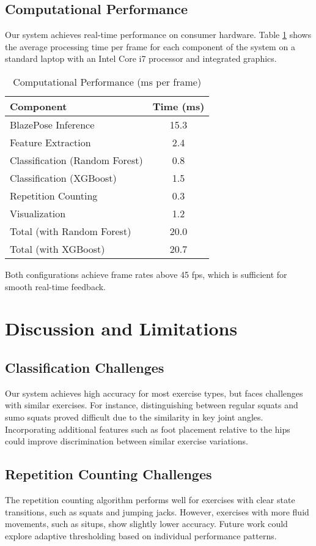 \documentclass[conference]{IEEEtran}
\begin{document}
\subsection{Computational Performance}
Our system achieves real-time performance on consumer hardware. Table \ref{tab:computation} shows the average processing time per frame for each component of the system on a standard laptop with an Intel Core i7 processor and integrated graphics.

\begin{table}[htbp]
\centering
\caption{Computational Performance (ms per frame)}
\label{tab:computation}
\begin{tabular}{@{}lc@{}}
\toprule
\textbf{Component} & \textbf{Time (ms)} \\
\midrule
BlazePose Inference & 15.3 \\
Feature Extraction & 2.4 \\
Classification (Random Forest) & 0.8 \\
Classification (XGBoost) & 1.5 \\
Repetition Counting & 0.3 \\
Visualization & 1.2 \\
\midrule
Total (with Random Forest) & 20.0 \\
Total (with XGBoost) & 20.7 \\
\bottomrule
\end{tabular}
\end{table}

Both configurations achieve frame rates above 45 fps, which is sufficient for smooth real-time feedback.

\section{Discussion and Limitations}

\subsection{Classification Challenges}
Our system achieves high accuracy for most exercise types, but faces challenges with similar exercises. For instance, distinguishing between regular squats and sumo squats proved difficult due to the similarity in key joint angles. Incorporating additional features such as foot placement relative to the hips could improve discrimination between similar exercise variations.

\subsection{Repetition Counting Challenges}
The repetition counting algorithm performs well for exercises with clear state transitions, such as squats and jumping jacks. However, exercises with more fluid movements, such as situps, show slightly lower accuracy. Future work could explore adaptive thresholding based on individual performance patterns.
\end{document}
